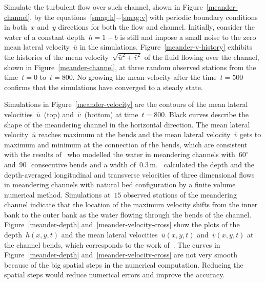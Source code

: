 \documentclass[12pt,a5paper]{article}
\newcommand{\uu}{{\bar u}}
\newcommand{\vv}{{\bar v}}
\begin{document}
Simulate the turbulent flow over such channel, shown in Figure~\ref{meander-channel}, by the equations~\eqref{smag:h}$-$\eqref{smag:v} with periodic boundary conditions in both~$x$ and~$y$ directions for both the flow and channel. Initially, consider the water of a constant depth~$h=1-b$ is still and impose a small noise to the zero mean lateral velocity~$\uu$ in the simulations. Figure~\ref{meander-v-history} exhibits the histories of the mean velocity~$\sqrt{\uu^2+\vv^2}$ of the fluid flowing over the channel, shown in Figure~\ref{meander-channel}, at three random observed stations from the time~$t=0$ to~$t=800$. No growing the mean velocity after the time~$t=500$ confirms that the simulations have converged to a steady state.

Simulations in Figure~\ref{meander-velocity} are the contours of the mean lateral velocities~$\uu$~(top) and~$\vv$~(bottom) at time~$t=800$. Black curves describe the shape of the meandering channel in the horizontal direction. The mean lateral velocity~$\uu$ reaches maximum at the bends and the mean lateral velocity~$\vv$ gets to maximum and minimum at the connection of the bends, which are consistent with the results of~\cite{Liu2009} who modelled the water in meandering channels with~$60^\circ$ and~$90^\circ$ consecutive bends and a width of~$0.3$\,m.~\cite{Demuren1993} calculated the depth and the depth-averaged longitudinal and transverse velocities of three dimensional flows in meandering channels with natural bed configuration by a finite volume numerical method. Simulations at~$15$ observed stations of the meandering channel indicate that the location of the maximum velocity shifts from the inner bank to the outer bank as the water flowing through the bends of the channel. Figure~\ref{meander-depth} and~\ref{meander-velocity-cross} show the plots of the depth~$h(x,y,t)$ and the mean lateral velocities~$\uu(x,y,t)$ and~$\vv(x,y,t)$ at the channel bends, which corresponds to the work of~\cite{Demuren1993}. The curves in Figure~\ref{meander-depth} and~\ref{meander-velocity-cross} are not very smooth because of the big spatial steps in the numerical computation. Reducing the spatial steps would reduce numerical errors and improve the accuracy.
\end{document}
